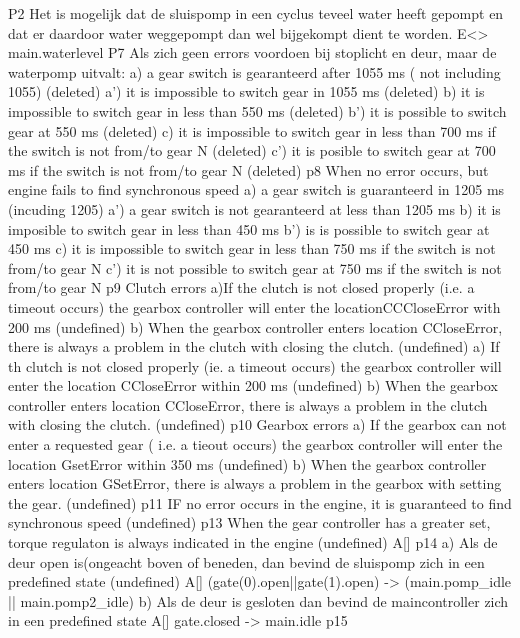  P2 Het is mogelijk dat de sluispomp in een cyclus teveel water heeft gepompt en dat er daardoor water weggepompt dan wel bijgekompt dient te worden.
 E<> main.waterlevel
 P7  Als zich geen errors voordoen bij stoplicht en deur, maar de waterpomp uitvalt:
 a)  a gear switch is gearanteerd after 1055 ms ( not including  1055)  (deleted)
 a') it is impossible  to switch gear in 1055 ms     (deleted)
 b) it is  impossible to switch gear in less than 550 ms (deleted)
 b') it is possible to switch gear at 550 ms (deleted)
 c) it is impossible to switch  gear in  less than 700 ms if the switch is not from/to gear N (deleted)
 c') it is posible to switch gear at 700 ms if the switch is not from/to gear N (deleted)
 p8 When no error occurs, but engine fails to find synchronous speed
 a) a gear switch is guaranteerd in 1205 ms (incuding 1205)
 a') a gear switch is not gearanteerd at less than 1205 ms
 b) it is imposible to switch gear in less than 450 ms
 b') is is possible to switch gear at 450 ms
 c) it is impossible to switch gear in less than 750 ms if the switch is not from/to gear N
 c') it is not possible to switch gear at 750 ms if the switch is not from/to gear N
 p9 Clutch errors
 a)If the clutch is not closed properly (i.e. a timeout occurs) the gearbox  controller will enter the locationCCCloseError with 200 ms   (undefined)
 b)  When the gearbox controller enters location CCloseError, there is always a problem in the clutch with closing the clutch.  (undefined)
 a) If th clutch is not closed properly (ie. a timeout occurs) the gearbox controller will enter the location CCloseError within 200 ms (undefined)
 b) When the gearbox controller enters location CCloseError, there is always a problem in the clutch with closing the clutch. (undefined)
 p10 Gearbox errors  
 a) If the gearbox can not enter a requested gear ( i.e. a tieout occurs) the gearbox controller will enter the location GsetError within 350 ms (undefined)
 b) When the gearbox controller enters location GSetError, there is always a problem in the gearbox with setting the gear. (undefined)
 p11 IF no error occurs in the engine, it is guaranteed to find synchronous speed (undefined)
 p13 When the gear controller has a greater set, torque regulaton is always indicated in the engine (undefined)
  A[]
 p14
 a) Als de deur open is(ongeacht boven of beneden, dan bevind de sluispomp zich in een predefined state (undefined)
 A[] (gate(0).open||gate(1).open) -> (main.pomp_idle || main.pomp2_idle)
 b) Als de deur is gesloten dan bevind de maincontroller zich in een predefined state
 A[] gate.closed -> main.idle
 p15
 
